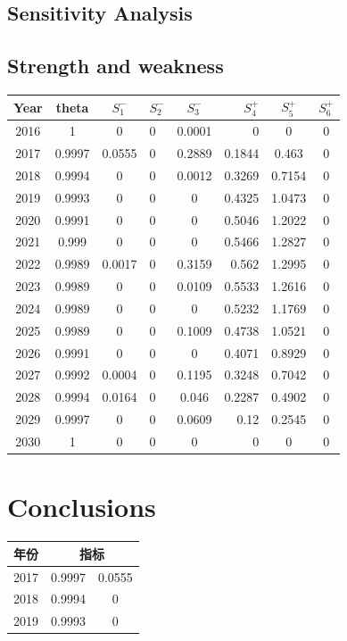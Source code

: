 \documentclass{mcmthesis}
\begin{document}
    \subsection{Sensitivity Analysis}
    \subsection{Strength and weakness}

\begin{center}
\begin{tabular}{c|cclcrcc}
\hline
Year & theta & $S_1^-$ & $S_2^-$ & $S_3^-$ & $S_4^+$ & $S_5^+$ & $S_6^+$ \\%
\hline
2016 & 1      & 0      & 0 & 0.0001 & 0      & 0      & 0 \\
2017 & 0.9997 & 0.0555 & 0 & 0.2889 & 0.1844 & 0.463  & 0 \\
2018 & 0.9994 & 0      & 0 & 0.0012 & 0.3269 & 0.7154 & 0 \\
2019 & 0.9993 & 0      & 0 & 0      & 0.4325 & 1.0473 & 0 \\
2020 & 0.9991 & 0      & 0 & 0      & 0.5046 & 1.2022 & 0 \\
2021 & 0.999  & 0      & 0 & 0      & 0.5466 & 1.2827 & 0 \\
2022 & 0.9989 & 0.0017 & 0 & 0.3159 & 0.562  & 1.2995 & 0 \\
2023 & 0.9989 & 0      & 0 & 0.0109 & 0.5533 & 1.2616 & 0 \\
2024 & 0.9989 & 0      & 0 & 0      & 0.5232 & 1.1769 & 0 \\
2025 & 0.9989 & 0      & 0 & 0.1009 & 0.4738 & 1.0521 & 0 \\
2026 & 0.9991 & 0      & 0 & 0      & 0.4071 & 0.8929 & 0 \\
2027 & 0.9992 & 0.0004 & 0 & 0.1195 & 0.3248 & 0.7042 & 0 \\
2028 & 0.9994 & 0.0164 & 0 & 0.046  & 0.2287 & 0.4902 & 0 \\
2029 & 0.9997 & 0      & 0 & 0.0609 & 0.12   & 0.2545 & 0 \\
2030 & 1      & 0      & 0 & 0      & 0      & 0      & 0 \\
\hline
\end{tabular}
\end{center}

\section{Conclusions}


\begin{center}
\begin{tabular}{c|cc}
\hline
年份 & \multicolumn{2}{c}{指标}\\
\hline
2017 & 0.9997 & 0.0555 \\
2018 & 0.9994 & 0      \\
2019 & 0.9993 & 0      \\
\hline
\end{tabular}
\end{center}
\end{document}
